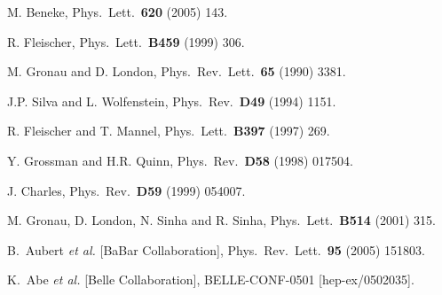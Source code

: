 \documentclass[11pt]{cernrep}
\begin{document}
\begin{thebibliography}{999}
M. Beneke,
  { Phys.\ Lett.}~{\bf 620} (2005) 143.

R. Fleischer,
  { Phys.\ Lett.}~{\bf B459} (1999) 306.

M. Gronau and D. London,
{ Phys.\ Rev.\ Lett.}~{\bf 65} (1990) 3381.

J.P. Silva and L. Wolfenstein,
{ Phys.\ Rev.}~{\bf D49} (1994) 1151.

R. Fleischer and T. Mannel,
{ Phys.\ Lett.}~{\bf B397} (1997) 269.

Y. Grossman and H.R. Quinn,
{ Phys.\ Rev.}~{\bf D58} (1998) 017504.

J. Charles,
{ Phys.\ Rev.}~{\bf D59} (1999) 054007.

M. Gronau, D. London, N. Sinha and R. Sinha,
{ Phys.\ Lett.}~{\bf B514} (2001) 315.

B.~Aubert {\it et al.}  [BaBar Collaboration],
  { Phys.\ Rev.\ Lett.}~{\bf 95} (2005) 151803.

K.~Abe {\it et al.}  [Belle Collaboration],
 BELLE-CONF-0501  [hep-ex/0502035].


\end{thebibliography}
\end{document}
